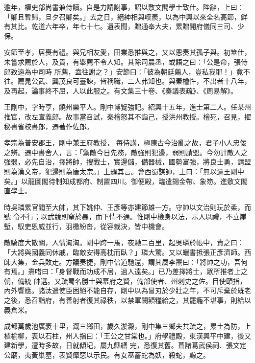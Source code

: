 \begin{pinyinscope}
 逾年，權吏部尚書兼侍讀。自是力請謝事，詔以敷文閣學士致仕。陛辭，上曰：「卿且暫歸，旦夕召卿矣。」去之日，縉紳相與嘆羨，以為中興以來全名高節，鮮有其比。乾道六年卒，年七十七。遺表聞，贈通奉大夫，累贈開府儀同三司、少保。



 安節至孝，居喪有禮。與兄相友愛，田業悉推與之，又以恩奏其孤子與。初筮仕，未嘗求薦於人，及貴，有舉薦不令人知。其除司農丞，或語之曰：「公是命，張侍郎致遠為中司時
 所薦，盍往謝之？」安節曰：「彼為朝廷薦人，豈私我耶！」竟不往。薦晁公武、龔茂良可臺諫，皆稱職，二人弗知也。與秦檜忤，不出者十八年，及再起，論事終不屈，人以此服之。有文集三十卷、《奏議表疏》、《周易解》。



 王剛中，字時亨，饒州樂平人。剛中博覽強記。紹興十五年，進士第二人。任某州推官，改左宣義郎。故事當召試，秦檜怒其不詣己，授洪州教授。檜死，召見，擢秘書省校書郎，遷著作佐郎。



 孝宗為普安郡王，剛中兼王府教授，
 每侍講，極陳古今治亂之故，君子小人忠佞之辨。遷中書舍人，言：「禦敵今日先務，敵強則犯邊，弱則請盟。今勿計敵人之強弱，必先自治，擇將帥，搜戰士，實邊儲，備器械，國勢富強，將良士勇，請盟則為漢文帝，犯邊則為唐太宗。」上韙其言。會西蜀謀帥，上曰：「無以逾王剛中矣。」以龍圖閣待制知成都府、制置四川。御便殿，臨遣錫金帶、象笏。進敷文閣直學士。



 時吳璘累官閥至大帥，其下姚仲、王彥等亦建節雄一方。守帥以文治則玩於柔，而號
 令不行；以武競則窒於暴，而下情不通。惟剛中檢身以法，示人以禮，不立崖塹，馭吏恩威並行，羽檄紛沓，從容裁決，皆中機會。



 敵騎度大散關，人情洶洶。剛中跨一馬，夜馳二百里，起吳璘於帳中，責之曰：「大將與國義同休戚，臨敵安得高枕而臥？」璘大驚。又以蠟書抵張正彥濟師。西師大集，金兵敗走。方議奏捷，剛中倍道馳還，謂其屬李燾曰：「將帥之功，吾何有焉。」燾唶曰：「身督戰而功成不居，過人遠矣。」已乃差擇將士，眾所推者上之朝，備統
 帥選。又疏蜀名勝士與幕府之賢，備部使者、州刺史之佐。目使頤指，內外響應。諸汰遣使臣困絕不能自存，剛中以為冒刃於少壯之年，不可斥棄於既老之後，悉召詣府，有善射者復其祿秩，以禁軍闕額糧給之，其罷癃不堪事，則給以義倉米。



 成都萬歲池廣袤十里，溉三鄉田，歲久淤澱，剛中集三鄉夫共疏之，累土為防，上植榆柳，表以石柱，州人指曰：「王公之甘棠也。」府學禮殿，東漢興平中建，後又建新學，遭時多故，日就傾圮，屬九縣繕
 完，悉復其舊。葺諸葛武侯祠、張文定公廟，夷黃巢墓，表賢癉惡以示民。有女巫蓄蛇為妖，殺蛇，黥之。




\end{pinyinscope}
